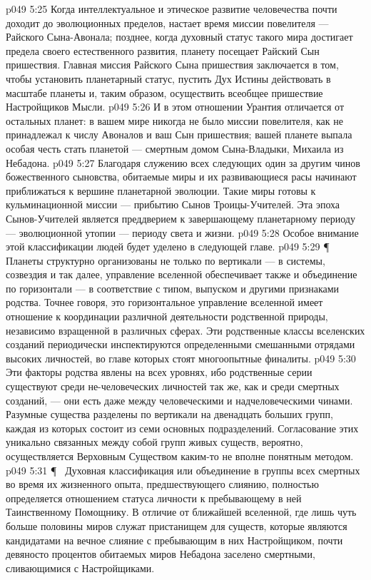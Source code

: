 \vs p049 5:25 Когда интеллектуальное и этическое развитие человечества почти доходит до эволюционных пределов, настает время миссии повелителя --- Райского Сына\hyp{}Авонала; позднее, когда духовный статус такого мира достигает предела своего естественного развития, планету посещает Райский Сын пришествия. Главная миссия Райского Сына пришествия заключается в том, чтобы установить планетарный статус, пустить Дух Истины действовать в масштабе планеты и, таким образом, осуществить всеобщее пришествие Настройщиков Мысли.
\vs p049 5:26 И в этом отношении Урантия отличается от остальных планет: в вашем мире никогда не было миссии повелителя, как не принадлежал к числу Авоналов и ваш Сын пришествия; вашей планете выпала особая честь стать планетой --- смертным домом Сына\hyp{}Владыки, Михаила из Небадона.
\vs p049 5:27 Благодаря служению всех следующих один за другим чинов божественного сыновства, обитаемые миры и их развивающиеся расы начинают приближаться к вершине планетарной эволюции. Такие миры готовы к кульминационной миссии --- прибытию Сынов Троицы\hyp{}Учителей. Эта эпоха Сынов\hyp{}Учителей является преддверием к завершающему планетарному периоду --- эволюционной утопии --- периоду света и жизни.
\vs p049 5:28 Особое внимание этой классификации людей будет уделено в следующей главе.
\vs p049 5:29 \P\ \bibnobreakspace {} Планеты структурно организованы не только по вертикали --- в системы, созвездия и так далее, управление вселенной обеспечивает также и объединение по горизонтали --- в соответствие с типом, выпуском и другими признаками родства. Точнее говоря, это горизонтальное управление вселенной имеет отношение к координации различной деятельности родственной природы, независимо взращенной в различных сферах. Эти родственные классы вселенских созданий периодически инспектируются определенными смешанными отрядами высоких личностей, во главе которых стоят многоопытные финалиты.
\vs p049 5:30 Эти факторы родства явлены на всех уровнях, ибо родственные серии существуют среди не\hyp{}человеческих личностей так же, как и среди смертных созданий, --- они есть даже между человеческими и надчеловеческими чинами. Разумные существа разделены по вертикали на двенадцать больших групп, каждая из которых состоит из семи основных подразделений. Согласование этих уникально связанных между собой групп живых существ, вероятно, осуществляется Верховным Существом каким\hyp{}то не вполне понятным методом.
\vs p049 5:31 \P\ \bibnobreakspace {} Духовная классификация или объединение в группы всех смертных во время их жизненного опыта, предшествующего слиянию, полностью определяется отношением статуса личности к пребывающему в ней Таинственному Помощнику. В отличие от ближайшей вселенной, где лишь чуть больше половины миров служат пристанищем для существ, которые являются кандидатами на вечное слияние с пребывающим в них Настройщиком, почти девяносто процентов обитаемых миров Небадона заселено смертными, сливающимися с Настройщиками.
